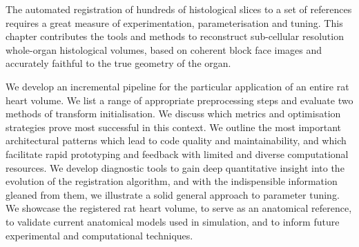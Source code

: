 The automated registration of hundreds of histological slices to a set of references requires a great measure of experimentation, parameterisation and tuning. This chapter contributes the tools and methods to reconstruct sub-cellular resolution whole-organ histological volumes, based on coherent block face images and accurately faithful to the true geometry of the organ.

We develop an incremental pipeline for the particular application of an entire rat heart volume. We list a range of appropriate preprocessing steps and evaluate two methods of transform initialisation. We discuss which metrics and optimisation strategies prove most successful in this context. We outline the most important architectural patterns which lead to code quality and maintainability, and which facilitate rapid prototyping and feedback with limited and diverse computational resources. We develop diagnostic tools to gain deep quantitative insight into the evolution of the registration algorithm, and with the indispensible information gleaned from them, we illustrate a solid general approach to parameter tuning. We showcase the registered rat heart volume, to serve as an anatomical reference, to validate current anatomical models used in simulation, and to inform future experimental and computational techniques.
